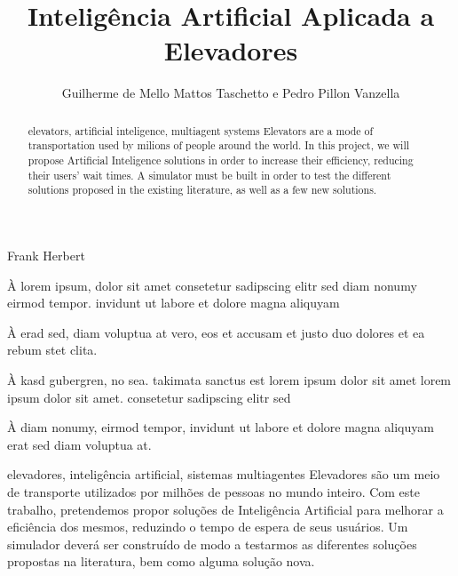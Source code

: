 \documentclass[portuguese,oneside]{tcc}
\author{Guilherme de Mello Mattos Taschetto e Pedro Pillon Vanzella}
\title{Inteligência Artificial Aplicada a Elevadores}
      {Artificial Intelligence Applied to Elevators}
\begin{document}
         {Frank Herbert}

\begin{agradecimentos}
À lorem ipsum, dolor sit amet consetetur sadipscing elitr sed diam
nonumy eirmod tempor. invidunt ut labore et dolore magna aliquyam

À erad sed, diam voluptua at vero, eos et accusam et justo duo
dolores et ea rebum stet clita.

À kasd gubergren, no sea. takimata sanctus est lorem ipsum dolor sit
amet lorem ipsum dolor sit amet. consetetur sadipscing elitr sed

À diam nonumy, eirmod tempor, invidunt ut labore et dolore magna
aliquyam erat sed diam voluptua at.
\end{agradecimentos}

\begin{resumo}{elevadores, inteligência artificial, sistemas multiagentes}
  Elevadores são um meio de transporte utilizados por milhões de pessoas no
  mundo inteiro. Com este trabalho, pretendemos propor soluções de Inteligência
  Artificial para melhorar a eficiência dos mesmos, reduzindo o tempo de espera
  de seus usuários.
  Um simulador deverá ser construído de modo a testarmos as diferentes soluções
  propostas na literatura, bem como alguma solução nova.
\end{resumo}

\begin{abstract}{elevators, artificial inteligence, multiagent systems}
  Elevators are a mode of transportation used by milions of people around the
  world. In this project, we will propose Artificial Inteligence solutions in
  order to increase their efficiency, reducing their users' wait times.
  A simulator must be built in order to test the different solutions proposed in
  the existing literature, as well as a few new solutions.
\end{abstract}

\tableofcontents












\end{document}
